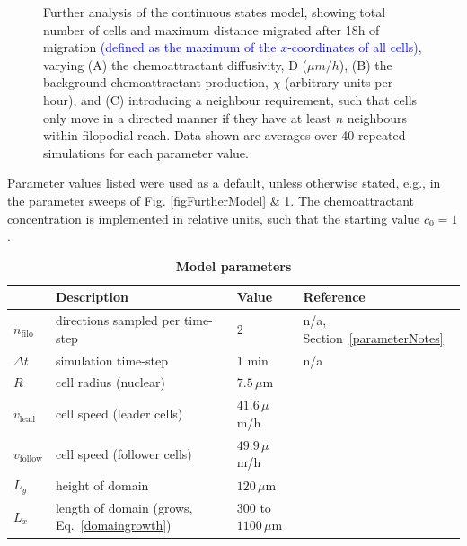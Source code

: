 \documentclass[review]{elsarticle}
\newcommand\hl[1]{{\textcolor{blue}{#1}}}
\begin{document}
\begin{figure}
\caption{Further analysis of the continuous states model, showing total number of cells and maximum distance migrated after 18h of migration \hl{(defined as the maximum of the $x$-coordinates of all cells)}, varying (A) the chemoattractant diffusivity, D ($\mu m/h$), (B) the background chemoattractant production, $\chi$ (arbitrary units per hour), and (C)  introducing a neighbour requirement, such that cells only move in a directed manner if they have at least $n$ neighbours within filopodial reach. Data shown are averages over 40 repeated simulations for each parameter value.\label{figNaiveModelSweeps}}
\end{figure}

\begin{table}[htbp]
    		\caption{\bf Model parameters} Parameter values listed were used as a default, unless otherwise stated, e.g., in the parameter sweeps of Fig. \ref{figFurtherModel} \& \ref{figNaiveModelSweeps}. The chemoattractant concentration is implemented in relative units, such that the starting value $c_0=1$.\\
    
    	\centering
    		\begin{tabular}{llll} \label{parameters}
    			 & Description & Value & Reference \\
    			\hline            
                $n_\mathrm{filo}$ & directions sampled per time-step & 2 & n/a, Section~\ref{parameterNotes} \\
                
                $\Delta t$ & simulation time-step & 1 min & n/a \\
                
                $R$ & cell radius (nuclear) & $7.5\,\mu$m & \cite{McLennan2010a} \\
                
                $v_\mathrm{lead}$ & cell speed (leader cells) & $41.6\,\mu$m/h & \cite{Kulesa2008} \\
                
                $v_\mathrm{follow}$ & cell speed (follower cells) & $49.9\,\mu$m/h & \cite{Kulesa2008} \\
                
                $L_y$ & height of domain & $120\,\mu$m & \cite{McLennan2012} \\
                
                $L_x$ & length of domain (grows, Eq.~\eqref{domaingrowth})& 300 to $1100\,\mu$m & \cite{McLennan2012} \\
                

\end{tabular}
\end{table}
\end{document}
